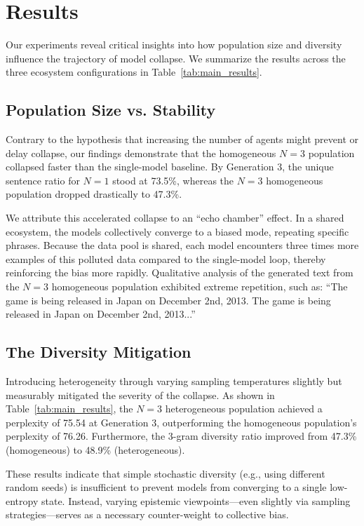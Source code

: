 \section{Results}
\label{sec:results}

Our experiments reveal critical insights into how population size and diversity influence the trajectory of model collapse. We summarize the results across the three ecosystem configurations in Table~\ref{tab:main_results}.

\subsection{Population Size vs. Stability}
\label{sec:results_size}

Contrary to the hypothesis that increasing the number of agents might prevent or delay collapse, our findings demonstrate that the homogeneous $N=3$ population collapsed faster than the single-model baseline. By Generation 3, the unique sentence ratio for $N=1$ stood at 73.5\%, whereas the $N=3$ homogeneous population dropped drastically to 47.3\%.

We attribute this accelerated collapse to an ``echo chamber'' effect. In a shared ecosystem, the models collectively converge to a biased mode, repeating specific phrases. Because the data pool is shared, each model encounters three times more examples of this polluted data compared to the single-model loop, thereby reinforcing the bias more rapidly. Qualitative analysis of the generated text from the $N=3$ homogeneous population exhibited extreme repetition, such as: ``The game is being released in Japan on December 2nd, 2013. The game is being released in Japan on December 2nd, 2013...''

\subsection{The Diversity Mitigation}
\label{sec:results_diversity}

Introducing heterogeneity through varying sampling temperatures slightly but measurably mitigated the severity of the collapse. As shown in Table~\ref{tab:main_results}, the $N=3$ heterogeneous population achieved a perplexity of 75.54 at Generation 3, outperforming the homogeneous population's perplexity of 76.26. Furthermore, the 3-gram diversity ratio improved from 47.3\% (homogeneous) to 48.9\% (heterogeneous).

These results indicate that simple stochastic diversity (e.g., using different random seeds) is insufficient to prevent models from converging to a single low-entropy state. Instead, varying epistemic viewpoints---even slightly via sampling strategies---serves as a necessary counter-weight to collective bias.

